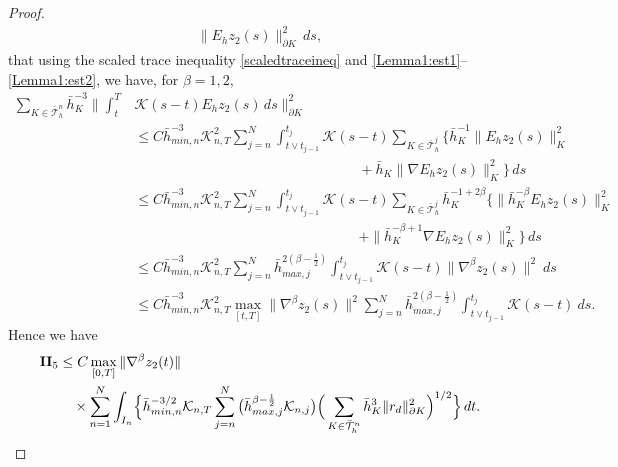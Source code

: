 \documentclass{amsart}
\numberwithin{equation}{section}
\theoremstyle{definition}
\begin{document}
\begin{proof}
\begin{equation*}
\begin{split}
        \|E_hz_2(s)\|_{\partial K}^2\,ds,
  \end{split}
\end{equation*}
that using the scaled trace inequality  \eqref{scaledtraceineq}  
and \eqref{Lemma1:est1}--\eqref{Lemma1:est2}, we have, for $\beta=1,2$,
\begin{equation*}
  \begin{split}
   \sum_{K\in\bar{\mathcal T}_h^n}  \bar h_K^{-3}
        \Big\|\int_t^T\! &{\mathcal K}(s-t)E_hz_2(s)\,ds
        \Big\|_{\partial K}^2\\
       &\le C \bar h_{min,n}^{-3} {\mathcal K}_{n,T}^2
        \sum_{j=n}^N\int_{t\vee t_{j-1}}^{t_j}\!
        {\mathcal K}(s-t) \sum_{K\in\bar {\mathcal T}_h^j}
        \big\{\bar h_K^{-1}
         \| E_hz_2(s)\|_K^2 \\
       &\qquad\qquad\qquad\qquad\qquad\qquad\qquad\qquad
        +\bar h_K \| \nabla E_hz_2(s)\|_K^2\big\}\,ds\\
       &\leq C \bar h_{min,n}^{-3} {\mathcal K}_{n,T}^2
        \sum_{j=n}^N\int_{t\vee t_{j-1}}^{t_j}\!
        {\mathcal K}(s-t) \sum_{K\in\bar {\mathcal T}_h^j}
        \bar h_K^{-1+2\beta}
        \big\{ \| \bar h_K^{-\beta} E_hz_2(s)\|_K^2 \\
       &\qquad\qquad\qquad\qquad\qquad\qquad\qquad\qquad
        +\|  \bar h_K^{-\beta+1} \nabla E_hz_2(s)\|_K^2\big\}\,ds\\
       &\leq C  \bar h_{min,n}^{-3} {\mathcal K}_{n,T}^2
        \sum_{j=n}^N \bar h_{max,j}^{2(\beta-\frac{1}{2})} \int_{t\vee t_{j-1}}^{t_j}\! 
        {\mathcal K}(s-t) \| \nabla^\beta z_2(s) \|^2\ ds\\
       &\leq C  \bar h_{min,n}^{-3} {\mathcal K}_{n,T}^2
        \max_{[t,T]} \| \nabla^\beta z_2(s) \|^2
        \sum_{j=n}^N \bar h_{max,j}^{2(\beta-\frac{1}{2})} \int_{t\vee t_{j-1}}^{t_j}\! 
        {\mathcal K}(s-t)\ ds.
  \end{split}
\end{equation*}
Hence we have
\begin{equation}   \label{II5}
  \begin{split}
    {\rm{\bf II}}_5
     &\le C \max_{[0,T]}\|\nabla^\beta z_2(t)\|\\
     &\quad\times 
     \sum_{n=1}^N\int_{I_n}\!
     \Big\{      
       \bar h_{min,n}^{-3/2} {\mathcal K}_{n,T}
       \sum_{j=n}^N \big( \bar h_{max,j}^{\beta-\frac{1}{2}} {\mathcal K}_{n,j}\big)
       \Big(\sum_{K\in\bar{\mathcal T}_h^n}\bar h_K^3
       \|r_d\|_{\partial K}^2\Big)^{1/2}
     \Big\}\,dt.
  \end{split}

\end{equation}
\end{proof}
\end{document}
